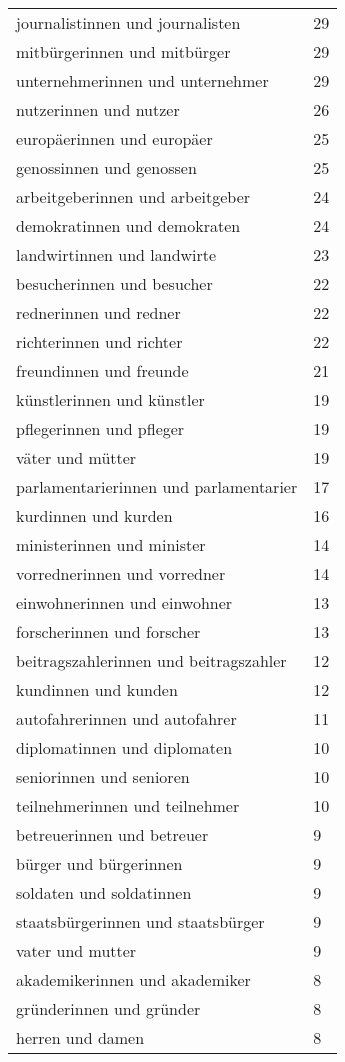 \begin{tabular}{ll}
journalistinnen und journalisten & 29\\
mitbürgerinnen und mitbürger & 29\\
unternehmerinnen und unternehmer & 29\\
nutzerinnen und nutzer & 26\\
europäerinnen und europäer & 25\\
genossinnen und genossen & 25\\
arbeitgeberinnen und arbeitgeber & 24\\
demokratinnen und demokraten & 24\\
landwirtinnen und landwirte & 23\\
besucherinnen und besucher & 22\\
rednerinnen und redner & 22\\
richterinnen und richter & 22\\
freundinnen und freunde & 21\\
künstlerinnen und künstler & 19\\
pflegerinnen und pfleger & 19\\
väter und mütter & 19\\
parlamentarierinnen und parlamentarier & 17\\
kurdinnen und kurden & 16\\
ministerinnen und minister & 14\\
vorrednerinnen und vorredner & 14\\
einwohnerinnen und einwohner & 13\\
forscherinnen und forscher & 13\\
beitragszahlerinnen und beitragszahler & 12\\
kundinnen und kunden & 12\\
autofahrerinnen und autofahrer & 11\\
diplomatinnen und diplomaten & 10\\
seniorinnen und senioren & 10\\
teilnehmerinnen und teilnehmer & 10\\
betreuerinnen und betreuer & 9\\
bürger und bürgerinnen & 9\\
soldaten und soldatinnen & 9\\
staatsbürgerinnen und staatsbürger & 9\\
vater und mutter & 9\\
akademikerinnen und akademiker & 8\\
gründerinnen und gründer & 8\\
herren und damen & 8\\

\end{tabular}
